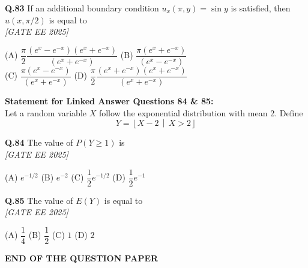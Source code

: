 \documentclass[11pt]{article}
\begin{document}
\begin{flushleft}
\textbf{Q.83} If an additional boundary condition $u_x(\pi, y) = \sin y$ is satisfied, then $u(x, \pi/2)$ is equal to 
\\[1ex] \textit{[GATE EE 2025]}

(A) $\dfrac{\pi}{2} \dfrac{(e^x - e^{-x})(e^x + e^{-x})}{(e^x + e^{-x})}$ \hspace{2em}
(B) $\dfrac{\pi (e^x + e^{-x})}{(e^x - e^{-x})}$ \\
(C) $\dfrac{\pi (e^x - e^{-x})}{(e^x + e^{-x})}$ \hspace{2em}
(D) $\dfrac{\pi}{2} \dfrac{(e^x + e^{-x})(e^x + e^{-x})}{(e^x + e^{-x})}$
\end{flushleft}

\vspace{1em}
\noindent\textbf{Statement for Linked Answer Questions 84 \& 85:} \\
Let a random variable $X$ follow the exponential distribution with mean 2. Define \\
\[
Y = \left\lfloor X - 2 \,\middle|\, X > 2 \right\rfloor
\]

\begin{flushleft}
\textbf{Q.84} The value of $P(Y \geq 1)$ is 
\\[1ex] \textit{[GATE EE 2025]}


(A) $e^{-1/2}$ \hspace{2em} (B) $e^{-2}$ \hspace{2em} (C) $\dfrac{1}{2} e^{-1/2}$ \hspace{2em} (D) $\dfrac{1}{2} e^{-1}$
\end{flushleft}

\begin{flushleft}
\textbf{Q.85} The value of $E(Y)$ is equal to 
\\[1ex] \textit{[GATE EE 2025]}

(A) $\dfrac{1}{4}$ \hspace{2em} (B) $\dfrac{1}{2}$ \hspace{2em} (C) $1$ \hspace{2em} (D) $2$
\end{flushleft}

\vspace{2em}
\begin{center}
\textbf{END OF THE QUESTION PAPER}
\end{center}
\end{document}
